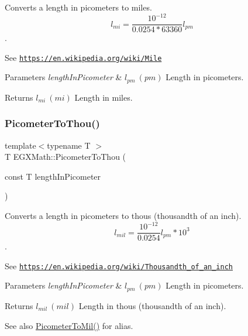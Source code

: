 Converts a length in picometers to miles. \[ l_{mi}=\frac{10^{-12}}{0.0254 * 63360} l_{pm} \]. 

See \href{https://en.wikipedia.org/wiki/Mile}{\tt https\+://en.\+wikipedia.\+org/wiki/\+Mile} 
\begin{DoxyParams}{Parameters}
{\em length\+In\+Picometer} & $ l_{pm}\ (pm)$ Length in picometers. \\
\hline
\end{DoxyParams}
\begin{DoxyReturn}{Returns}
$ l_{mi}\ (mi)$ Length in miles. 
\end{DoxyReturn}
\mbox{\label{group___e_g_x_math-_conversions-_length_conversions-_s_i-_picometer-_imperial_gabf48007bf90e25f6d23f847101fd35f1}} 
\subsubsection{\texorpdfstring{Picometer\+To\+Thou()}{PicometerToThou()}}
{\footnotesize\ttfamily template$<$typename T $>$ \\
T E\+G\+X\+Math\+::\+Picometer\+To\+Thou (\begin{DoxyParamCaption}\item[{const T}]{length\+In\+Picometer }\end{DoxyParamCaption})}



Converts a length in picometers to thous (thousandth of an inch). \[ l_{mil}= \frac{10^{-12}}{0.0254} l_{pm} * 10^{3} \]. 

See \href{https://en.wikipedia.org/wiki/Thousandth_of_an_inch}{\tt https\+://en.\+wikipedia.\+org/wiki/\+Thousandth\+\_\+of\+\_\+an\+\_\+inch} 
\begin{DoxyParams}{Parameters}
{\em length\+In\+Picometer} & $ l_{pm}\ (pm)$ Length in picometers. \\
\hline
\end{DoxyParams}
\begin{DoxyReturn}{Returns}
$ l_{mil}\ (mil)$ Length in thous (thousandth of an inch). 
\end{DoxyReturn}
\begin{DoxySeeAlso}{See also}
\mbox{\hyperlink{group___e_g_x_math-_conversions-_length_conversions-_s_i-_picometer-_imperial_ga727778c82b4049ff45091f492993150d}{Picometer\+To\+Mil()}} for alias. 
\end{DoxySeeAlso}
\mbox{\label{group___e_g_x_math-_conversions-_length_conversions-_s_i-_picometer-_imperial_ga18b17a118ffb1092beefc221f44a97a2}} 
